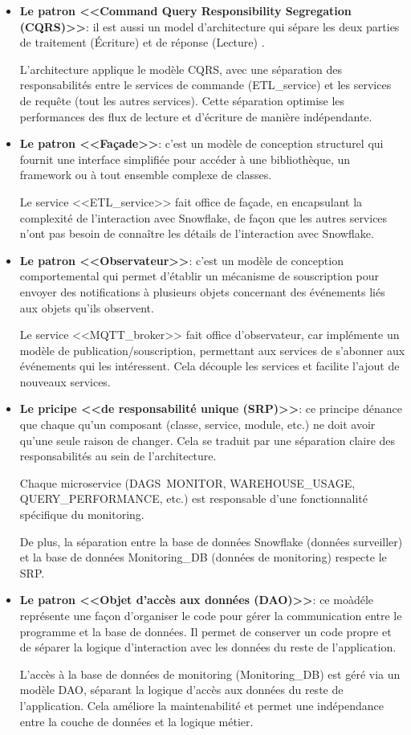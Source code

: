 \begin{itemize}
    \item \textbf{Le patron <<Command Query Responsibility Segregation (CQRS)>>}: il est aussi un model d'architecture qui sépare les deux parties de traitement (Écriture) et de réponse (Lecture) \cite{CQRS}.
    \par L'architecture applique le modèle CQRS, avec une séparation des responsabilités entre le services de commande (ETL\_service) et les services de requête (tout les autres services).
    Cette séparation optimise les performances des flux de lecture et d'écriture de manière indépendante.
    \item \textbf{Le patron <<Façade>>}: c'est un modèle de conception structurel qui fournit une interface simplifiée pour accéder à une bibliothèque, 
    un framework ou à tout ensemble complexe de classes\cite{facade}.
    \par Le service <<ETL\_service>> fait office de façade, en encapsulant la complexité de l'interaction avec Snowflake, 
    de façon que les autres services n'ont pas besoin de connaître les détails de l'interaction avec Snowflake.
    \item \textbf{Le patron <<Observateur>>}: c'est un modèle de conception comportemental qui permet d'établir un mécanisme de souscription pour envoyer des notifications à plusieurs objets concernant des événements liés aux objets qu'ils observent\cite{observer}.
    \par Le service <<MQTT\_broker>> fait office d'observateur, car implémente un modèle de publication/souscription, permettant aux services de s'abonner aux événements qui les intéressent.
    Cela découple les services et facilite l'ajout de nouveaux services.
    \item \textbf{Le pricipe <<de responsabilité unique (SRP)>>}: ce principe dénance que chaque qu'un composant (classe, service, module, etc.) ne doit avoir qu'une seule raison de changer. 
    Cela se traduit par une séparation claire des responsabilités au sein de l'architecture\cite{SRP}.
    \par Chaque microservice (DAGS\ MONITOR, WAREHOUSE\_USAGE, QUERY\_PERFORMANCE, etc.) est responsable d'une fonctionnalité spécifique du monitoring.
   \par De plus, la séparation entre la base de données Snowflake (données surveiller) et la base de données Monitoring\_DB (données de monitoring) respecte le SRP.
    \item \textbf{Le patron <<Objet d'accès aux données (DAO)>>}: ce moàdéle représente une façon d'organiser le code pour gérer la communication entre le programme et la base de données.
    Il permet de conserver un code propre et de séparer la logique d'interaction avec les données du reste de l'application\cite{DAO}.
    \par L'accès à la base de données de monitoring (Monitoring\_DB) est géré via un modèle DAO, séparant la logique d'accès aux données du reste de l'application.
    Cela améliore la maintenabilité et permet une indépendance entre la couche de données et la logique métier.
\end{itemize}

